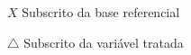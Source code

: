 \begin{simbolos}
	\item[$X$] Subscrito da base referencial
	\item[$\triangle$] Subscrito da variável tratada
\end{simbolos}

